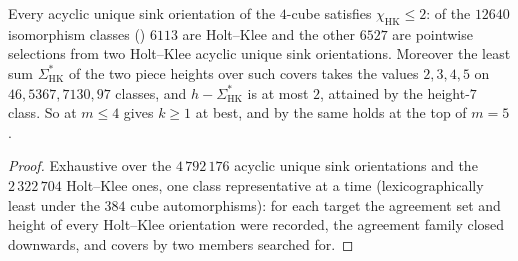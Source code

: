 \begin{proposition}\label{mb:chi-four}
Every acyclic unique sink orientation of the $4$-cube satisfies
$\chi_{\mathrm{HK}}\le2$: of the $12640$ isomorphism classes
() $6113$ are Holt--Klee and the other $6527$ are
pointwise selections from two Holt--Klee acyclic unique sink orientations.
Moreover the least sum $\Sigma^{\ast}_{\mathrm{HK}}$ of the two piece
heights over such covers takes the values $2,3,4,5$ on
$46,5367,7130,97$ classes, and $h-\Sigma^{\ast}_{\mathrm{HK}}$ is at most
$2$, attained by the height-$7$ class. So at $m\le4$ 
gives $k\ge1$ at best, and by  the same holds at the top
of $m=5$.
\end{proposition}

\begin{proof}
Exhaustive over the $4\,792\,176$ acyclic unique sink orientations and the
$2\,322\,704$ Holt--Klee ones, one class representative at a time
(lexicographically least under the $384$ cube automorphisms): for each
target the agreement set and height of every Holt--Klee orientation were
recorded, the agreement family closed downwards, and covers by two members
searched for.
\end{proof}

